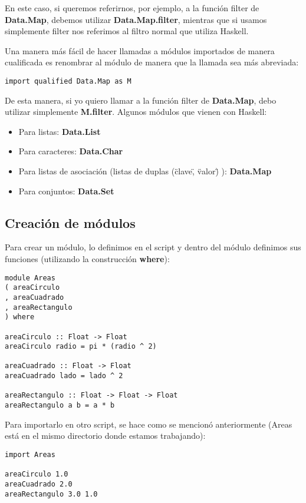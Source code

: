 En este caso, si queremos referirnos, por ejemplo, a la función filter de \textbf{Data.Map}, debemos utilizar \textbf{Data.Map.filter}, mientras que si usamos simplemente filter nos referimos al filtro normal que utiliza Haskell.

Una manera más fácil de hacer llamadas a módulos importados de manera cualificada es renombrar al módulo de manera que la llamada sea más abreviada:

\begin{lstlisting}
import qualified Data.Map as M
\end{lstlisting}

De esta manera, si yo quiero llamar a la función filter de \textbf{Data.Map}, debo utilizar simplemente \textbf{M.filter}. Algunos módulos que vienen con Haskell:

\begin{itemize}
  \item Para listas: \textbf{Data.List}
  \item Para caracteres: \textbf{Data.Char}
  \item Para listas de asociación (listas de duplas (\"clave\", \"valor\") ): \textbf{Data.Map}
  \item Para conjuntos: \textbf{Data.Set}
\end{itemize}

\subsection{Creación de módulos} %
\label{sub:creaci_n_de_m_dulos}

Para crear un módulo, lo definimos en el script y dentro del módulo definimos sus funciones (utilizando la construcción \textbf{where}):

\begin{lstlisting}
module Areas
( areaCirculo
, areaCuadrado
, areaRectangulo
) where

areaCirculo :: Float -> Float
areaCirculo radio = pi * (radio ^ 2)

areaCuadrado :: Float -> Float
areaCuadrado lado = lado ^ 2

areaRectangulo :: Float -> Float -> Float
areaRectangulo a b = a * b
\end{lstlisting}

Para importarlo en otro script, se hace como se mencionó anteriormente (Areas está en el mismo directorio donde estamos trabajando):

\begin{lstlisting}
import Areas

areaCirculo 1.0
areaCuadrado 2.0
areaRectangulo 3.0 1.0
\end{lstlisting}



